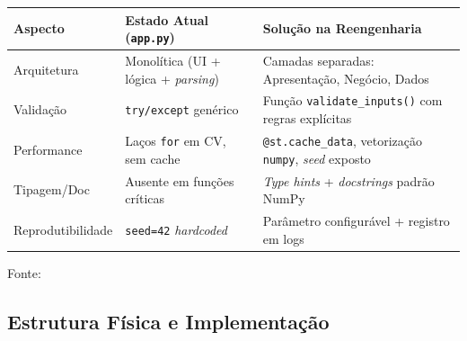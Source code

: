 \begin{quadro}[ht]
\begin{center}
\small
\captionsetup{justification=centering, labelsep=endash, width=0.75\linewidth}
\caption{Diagnóstico do código legado e arquitetura proposta}
\label{quadro:diag}
\begin{threeparttable}
\begin{tabularx}{\textwidth}{|l|X|X|} \hline
\textbf{Aspecto} & \textbf{Estado Atual (\texttt{app.py})} & \textbf{Solução na Reengenharia} \\ \hline
Arquitetura & Monolítica (UI + lógica + \textit{parsing}) & Camadas separadas: Apresentação, Negócio, Dados \\ \hline
Validação & \texttt{try/except} genérico & Função \texttt{validate\_inputs()} com regras explícitas \\ \hline
Performance & Laços \texttt{for} em CV, sem cache & \texttt{@st.cache\_data}, vetorização \texttt{numpy}, \textit{seed} exposto \\ \hline
Tipagem/Doc & Ausente em funções críticas & \textit{Type hints} + \textit{docstrings} padrão NumPy \\ \hline
Reprodutibilidade & \texttt{seed=42} \textit{hardcoded} & Parâmetro configurável + registro em logs \\ \hline
\end{tabularx}
\begin{tablenotes}[flushleft]
\footnotesize
\item Fonte:~\oautor
\end{tablenotes}
\end{threeparttable}
\end{center}
\end{quadro}

\subsection{Estrutura Física e Implementação}
\label{subsec:fisico-impl}

